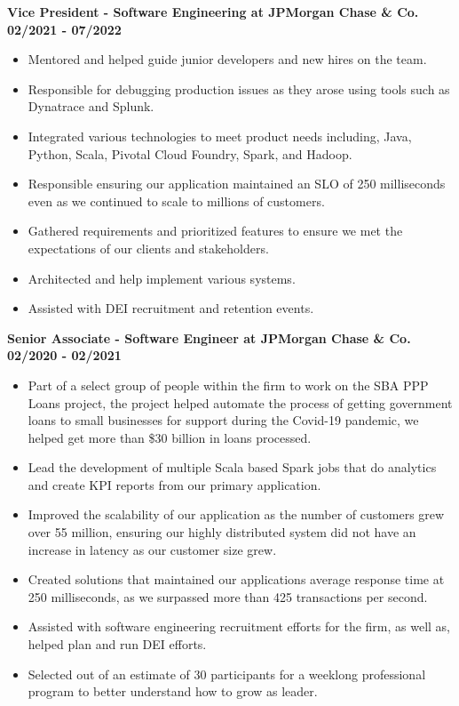 \documentclass{res}
\begin{document}
\begin{resume}
	\textbf{Vice President - Software Engineering at JPMorgan Chase \& Co.}
	\hfill{\bf 02/2021 - 07/2022}
	\begin{itemize}
		\item Mentored and helped guide junior developers and new hires on the team.
		\item Responsible for debugging production issues as they arose using tools such as Dynatrace and Splunk. 
		\item Integrated various technologies to meet product needs including, Java, Python, Scala, Pivotal Cloud Foundry, Spark, and Hadoop.	
		\item Responsible ensuring our application maintained an SLO of 250 milliseconds even as we continued to scale to millions of customers.
		\item Gathered requirements and prioritized features to ensure we met the expectations of our clients and stakeholders.
		\item Architected and help implement various systems.
		\item Assisted with DEI recruitment and retention events.
	\end{itemize}
	
	\textbf{Senior Associate - Software Engineer at JPMorgan Chase \& Co.}
	\hfill{\bf 02/2020 - 02/2021}
	\begin{itemize}
		\item Part of a select group of people within the firm to work on the SBA PPP Loans project, the project helped automate the process of getting government loans to small businesses for support during the Covid-19
pandemic, we helped get more than \$30 billion in loans processed.
		\item Lead the development of multiple Scala based Spark jobs that do analytics and create KPI reports from our primary application.
		\item Improved the scalability of our application as the number of customers grew over 55 million, ensuring our highly distributed system did not have an increase in latency as our customer size grew.
		\item Created solutions that maintained our applications average response time at 250 milliseconds, as we surpassed more than 425 transactions per second.
		\item Assisted with software engineering recruitment efforts for the firm, as well as, helped plan and run DEI efforts.
		\item Selected out of an estimate of 30 participants for a weeklong professional program to better understand how to grow as leader.
	\end{itemize}


\end{resume}
\end{document}
